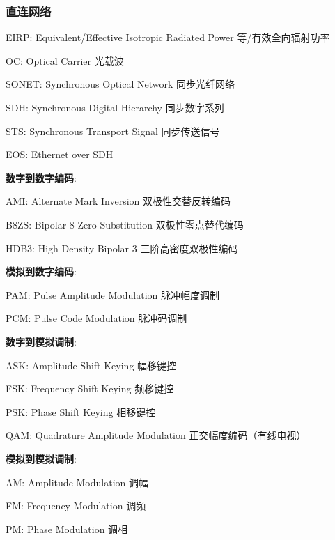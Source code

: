 \documentclass[UTF8,cs4size]{ctexart}
\begin{document}
\subsubsection{直连网络}
\begin{compactitem}
  \item EIRP: Equivalent/Effective Isotropic Radiated Power 等/有效全向辐射功率
  \item OC: Optical Carrier 光载波
  \item SONET: Synchronous Optical Network 同步光纤网络
  \item SDH: Synchronous Digital Hierarchy 同步数字系列
  \item STS: Synchronous Transport Signal 同步传送信号
  \item EOS: Ethernet over SDH
\end{compactitem}

\textbf{数字到数字编码}:
\begin{compactitem}
  \item AMI: Alternate Mark Inversion 双极性交替反转编码
  \item B8ZS: Bipolar 8-Zero Substitution 双极性零点替代编码
  \item HDB3: High Density Bipolar 3 三阶高密度双极性编码
\end{compactitem}

\textbf{模拟到数字编码}:
\begin{compactitem}
  \item PAM: Pulse Amplitude Modulation 脉冲幅度调制
  \item PCM: Pulse Code Modulation 脉冲码调制
\end{compactitem}

\textbf{数字到模拟调制}:
\begin{compactitem}
  \item ASK: Amplitude Shift Keying 幅移键控
  \item FSK: Frequency Shift Keying 频移键控
  \item PSK: Phase Shift Keying 相移键控
  \item QAM: Quadrature Amplitude  Modulation 正交幅度编码（有线电视）
\end{compactitem}

\textbf{模拟到模拟调制}:
\begin{compactitem}
  \item AM: Amplitude Modulation 调幅
  \item FM: Frequency Modulation 调频
  \item PM: Phase Modulation 调相
\end{compactitem}
\end{document}
